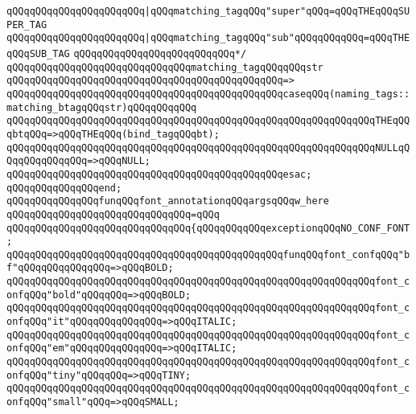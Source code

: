 \verb|qQQqqQQqqQQqqQQqqQQqqQQq|\verb#|qQQqmatching_tagqQQq"super"qQQq=qQQqTHEqQQqSUPER_TAG#\newline
\verb|qQQqqQQqqQQqqQQqqQQqqQQq|\verb#|qQQqmatching_tagqQQq"sub"qQQqqQQqqQQq=qQQqTHEqQQqSUB_TAG#\newline
\verb|qQQqqQQqqQQqqQQqqQQqqQQqqQQq*/|\newline
\verb|qQQqqQQqqQQqqQQqqQQqqQQqqQQqqQQqmatching_tagqQQqqQQqstr|\newline
\verb|qQQqqQQqqQQqqQQqqQQqqQQqqQQqqQQqqQQqqQQqqQQqqQQq=>|\newline
\verb|qQQqqQQqqQQqqQQqqQQqqQQqqQQqqQQqqQQqqQQqqQQqqQQqcaseqQQq(naming_tags::matching_btagqQQqstr)qQQqqQQqqQQq|\newline
\verb|qQQqqQQqqQQqqQQqqQQqqQQqqQQqqQQqqQQqqQQqqQQqqQQqqQQqqQQqqQQqqQQqTHEqQQqbtqQQq=>qQQqTHEqQQq(bind_tagqQQqbt);|\newline
\verb|qQQqqQQqqQQqqQQqqQQqqQQqqQQqqQQqqQQqqQQqqQQqqQQqqQQqqQQqqQQqqQQqNULLqQQqqQQqqQQqqQQq=>qQQqNULL;|\newline
\verb|qQQqqQQqqQQqqQQqqQQqqQQqqQQqqQQqqQQqqQQqqQQqqQQqesac;|\newline
\verb|qQQqqQQqqQQqqQQqend;|\newline
\newline
\verb|qQQqqQQqqQQqqQQqfunqQQqfont_annotationqQQqargsqQQqw_here|\newline
\verb|qQQqqQQqqQQqqQQqqQQqqQQqqQQqqQQq=qQQq|\newline
\verb|qQQqqQQqqQQqqQQqqQQqqQQqqQQqqQQq{qQQqqQQqqQQqexceptionqQQqNO_CONF_FONT;|\newline
\newline
\verb|qQQqqQQqqQQqqQQqqQQqqQQqqQQqqQQqqQQqqQQqqQQqqQQqfunqQQqfont_confqQQq"bf"qQQqqQQqqQQqqQQq=>qQQqBOLD;|\newline
\verb|qQQqqQQqqQQqqQQqqQQqqQQqqQQqqQQqqQQqqQQqqQQqqQQqqQQqqQQqqQQqqQQqfont_confqQQq"bold"qQQqqQQq=>qQQqBOLD;|\newline
\verb|qQQqqQQqqQQqqQQqqQQqqQQqqQQqqQQqqQQqqQQqqQQqqQQqqQQqqQQqqQQqqQQqfont_confqQQq"it"qQQqqQQqqQQqqQQq=>qQQqITALIC;|\newline
\verb|qQQqqQQqqQQqqQQqqQQqqQQqqQQqqQQqqQQqqQQqqQQqqQQqqQQqqQQqqQQqqQQqfont_confqQQq"em"qQQqqQQqqQQqqQQq=>qQQqITALIC;|\newline
\verb|qQQqqQQqqQQqqQQqqQQqqQQqqQQqqQQqqQQqqQQqqQQqqQQqqQQqqQQqqQQqqQQqfont_confqQQq"tiny"qQQqqQQq=>qQQqTINY;|\newline
\verb|qQQqqQQqqQQqqQQqqQQqqQQqqQQqqQQqqQQqqQQqqQQqqQQqqQQqqQQqqQQqqQQqfont_confqQQq"small"qQQq=>qQQqSMALL;|\newline
